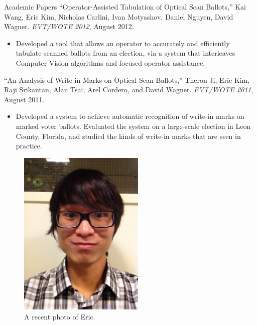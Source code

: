 \documentclass{resume}
\begin{document}
\vspace{1.0em}

\begin{component}{Academic Papers}
\vspace{0.5em}
``Operator-Assisted Tabulation of Optical Scan Ballots,'' Kai Wang, Eric Kim, Nicholas Carlini, Ivan Motyashov, Daniel Nguyen, David Wagner. \emph{EVT/WOTE 2012}, August 2012.
        \begin{itemize}
        \vspace{-0.5em}\item[] Developed a tool that allows an operator
to accurately and efficiently tabulate scanned ballots from an election,
via a system that interleaves Computer Vision algorithms and focused
operator assistance.
        \end{itemize}

``An Analysis of Write-in Marks on Optical Scan Ballots,'' Theron Ji, Eric Kim, Raji Srikantan, Alan Tsai, Arel Cordero, and David Wagner. \emph{EVT/WOTE 2011}, August 2011.
	\begin{itemize}
	\vspace{-0.5em}\item[] Developed a system to achieve automatic recognition of write-in marks on marked voter ballots. Evaluated the system on
				       a large-scale election in Leon County, Florida, and studied the kinds of write-in marks that are seen in practice.
	\end{itemize}
\end{component}

\begin{figure}[htb]
\centering
\includegraphics[height=8.0cm]{ek_headshot.jpg}
\caption{A recent photo of Eric.}
\end{figure}
\end{document}
